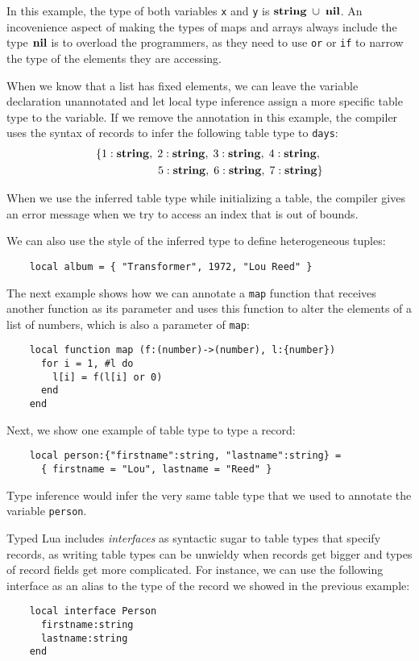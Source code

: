 In this example, the type of both variables \texttt{x} and \texttt{y}
is $\mathbf{string}\;\cup\;\mathbf{nil}$.
An incovenience aspect of making the types of maps and arrays always
include the type $\mathbf{nil}$ is to overload the programmers,
as they need to use \texttt{or} or \texttt{if} to narrow the type of
the elements they are accessing. 

When we know that a list has fixed elements, we can leave the
variable declaration unannotated and let local type inference assign
a more specific table type to the variable.
If we remove the annotation in this example, the compiler uses the
syntax of records to infer the following table type to \texttt{days}:
\begin{align*}
\{{1:\mathbf{string}},\;{2:\mathbf{string}},\;{3:\mathbf{string}},\;{4:\mathbf{string}},\;\\
{5:\mathbf{string}},\;{6:\mathbf{string}},\;{7:\mathbf{string}}\}
\end{align*}

When we use the inferred table type while initializing a table, the
compiler gives an error message when we try to access an index that
is out of bounds.

We can also use the style of the inferred type to define heterogeneous
tuples:
\begin{verbatim}
    local album = { "Transformer", 1972, "Lou Reed" }
\end{verbatim}

The next example shows how we can annotate a \texttt{map} function
that receives another function as its parameter and uses this
function to alter the elements of a list of numbers, which is
also a parameter of \texttt{map}:
\begin{verbatim}
    local function map (f:(number)->(number), l:{number})
      for i = 1, #l do
        l[i] = f(l[i] or 0)
      end
    end
\end{verbatim}

Next, we show one example of table type to type a record:
\begin{verbatim}
    local person:{"firstname":string, "lastname":string} =
      { firstname = "Lou", lastname = "Reed" } 
\end{verbatim}

Type inference would infer the very same table type that we used to
annotate the variable \texttt{person}.

Typed Lua includes \emph{interfaces} as syntactic sugar to table types
that specify records, as writing table types can be unwieldy when
records get bigger and types of record fields get more complicated.
For instance, we can use the following interface as an alias to the
type of the record we showed in the previous example:
\begin{verbatim}
    local interface Person
      firstname:string
      lastname:string
    end
\end{verbatim}

